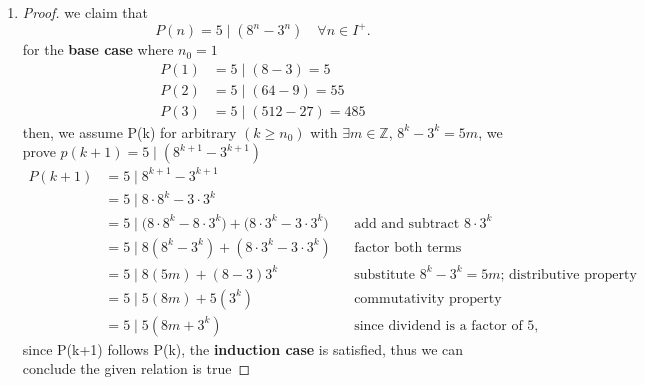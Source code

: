 \begin{enumerate}[label=\arabic*.]
    \item 
  \begin{proof}
      we claim that
      \[
          P(n) = 5 \mid (8^n - 3^n) \quad \forall n \in I^+.
      \]
      for the \textbf{base case} where $n_0 = 1$
      \[
      \begin{aligned}
      P(1) &= 5 \mid (8 - 3) = 5 \\
      P(2) &= 5 \mid (64 - 9) = 55 \\
      P(3) &= 5 \mid (512 - 27) = 485
      \end{aligned}
      \]
      then, we assume P(k) for arbitrary $(k \ge n_0)$ with $\exists  m \in \mathbb{Z}$, $8^k - 3^k
  = 5m$, we prove $p(k+1) = 5 \mid (8^{k+1}
  - 3^{k+1})$
      \begin{align*}
      P(k+1) &= 5 \mid 8^{k+1} - 3^{k+1}\\
      &= 5 \mid 8 \cdot 8^k - 3 \cdot 3^k\\
      &= 5 \mid \bigl(8 \cdot 8^k - 8 \cdot 3^k\bigr) + \bigl(8 \cdot 3^k - 3 \cdot 3^k\bigr) && \text{add and subtract }8 \cdot 3^k\\
      &= 5 \mid 8(8^k - 3^k) + (8 \cdot 3^k - 3 \cdot 3^k) &&
  \text{factor both terms}\\
      &= 5 \mid 8(5m) + (8-3)3^k && \text{substitute } 8^k - 3^k = 5m \text{; distributive property}\\
      &= 5 \mid 5(8m) + 5(3^k) && \text{commutativity property}\\
      &= 5 \mid 5(8m + 3^k) && \text{since dividend is a factor of 5, satement holds true}
      \end{align*}
      since P(k+1) follows P(k), the \textbf{induction case} is
  satisfied, thus we can conclude the given relation is true
   \end{proof}


\end{enumerate}
